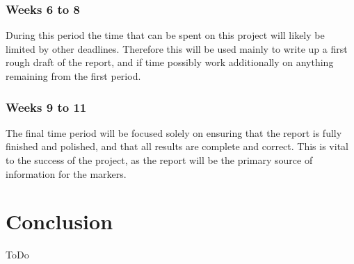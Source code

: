 \documentclass[bsc,frontabs,twoside,singlespacing,parskip,deptreport]{infthesis}     %
\begin{document}
\subsection{Weeks 6 to 8}
During this period the time that can be spent on this project will likely be limited by other deadlines. Therefore this will be used mainly to write up a first rough draft of the report, and if time possibly work additionally on anything remaining from the first period.
\subsection{Weeks 9 to 11}
The final time period will be focused solely on ensuring that the report is fully finished and polished, and that all results are complete and correct. This is vital to the success of the project, as the report will be the primary source of information for the markers.
\chapter{Conclusion}
ToDo



\end{document}
